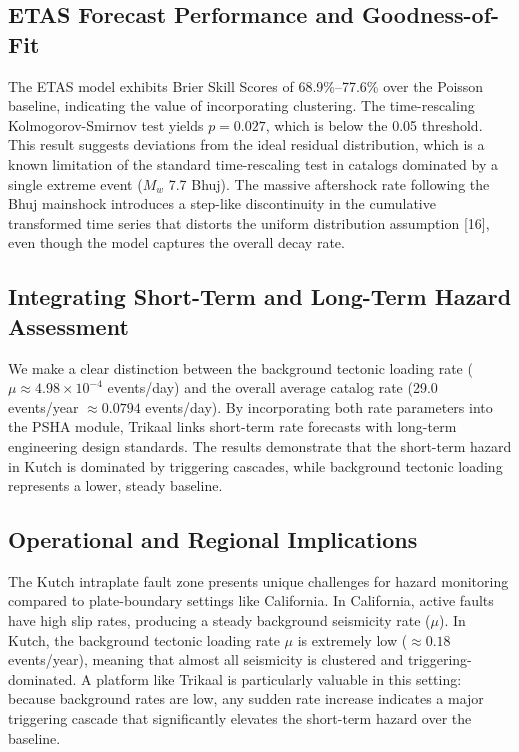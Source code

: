 \documentclass[journal]{IEEEtran}
\begin{document}
\subsection{ETAS Forecast Performance and Goodness-of-Fit}
The ETAS model exhibits Brier Skill Scores of 68.9\%–77.6\% over the Poisson baseline, indicating the value of incorporating clustering. The time-rescaling Kolmogorov-Smirnov test yields $p = 0.027$, which is below the 0.05 threshold. This result suggests deviations from the ideal residual distribution, which is a known limitation of the standard time-rescaling test in catalogs dominated by a single extreme event ($M_w$ 7.7 Bhuj). The massive aftershock rate following the Bhuj mainshock introduces a step-like discontinuity in the cumulative transformed time series that distorts the uniform distribution assumption [16], even though the model captures the overall decay rate.

\subsection{Integrating Short-Term and Long-Term Hazard Assessment}
We make a clear distinction between the background tectonic loading rate ($\mu \approx 4.98 \times 10^{-4}$ events/day) and the overall average catalog rate (29.0 events/year $\approx 0.0794$ events/day). By incorporating both rate parameters into the PSHA module, Trikaal links short-term rate forecasts with long-term engineering design standards. The results demonstrate that the short-term hazard in Kutch is dominated by triggering cascades, while background tectonic loading represents a lower, steady baseline.

\subsection{Operational and Regional Implications}
The Kutch intraplate fault zone presents unique challenges for hazard monitoring compared to plate-boundary settings like California. In California, active faults have high slip rates, producing a steady background seismicity rate ($\mu$). In Kutch, the background tectonic loading rate $\mu$ is extremely low ($\approx 0.18$ events/year), meaning that almost all seismicity is clustered and triggering-dominated. A platform like Trikaal is particularly valuable in this setting: because background rates are low, any sudden rate increase indicates a major triggering cascade that significantly elevates the short-term hazard over the baseline.
\end{document}
